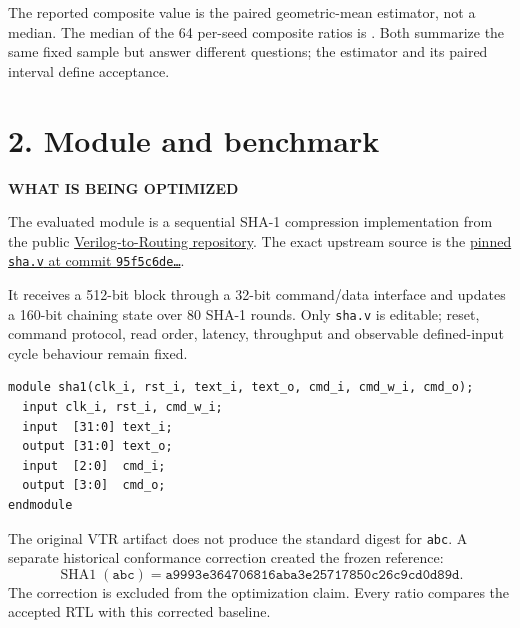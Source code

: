 \documentclass[10pt,a4paper]{article}
\newcommand{\smallcaps}[1]{\textcolor{Mid}{\fontsize{8.5}{10}\selectfont\bfseries\MakeUppercase{#1}}}
\newcommand{\newpageheading}[2]{\clearpage\section{#1}\smallcaps{#2}\vspace{6pt}}
\begin{document}
The reported composite value \AcceptedScore{} is the paired geometric-mean estimator, not a median. The median of the 64 per-seed composite ratios is \AcceptedCompositeMedian. Both summarize the same fixed sample but answer different questions; the estimator and its paired interval define acceptance.

\newpageheading{2. Module and benchmark}{What is being optimized}

The evaluated module is a sequential SHA-1 compression implementation from the public
\href{https://github.com/verilog-to-routing/vtr-verilog-to-routing}{Verilog-to-Routing repository}. The exact upstream source is the
\href{https://github.com/verilog-to-routing/vtr-verilog-to-routing/blob/95f5c6de9e158371ba7185bf97c07a84153735d6/vtr_flow/benchmarks/verilog/sha.v}{pinned \texttt{sha.v} at commit \texttt{95f5c6de…}}.

It receives a 512-bit block through a 32-bit command/data interface and updates a 160-bit chaining state over 80 SHA-1 rounds. Only \texttt{sha.v} is editable; reset, command protocol, read order, latency, throughput and observable defined-input cycle behaviour remain fixed.

\begin{lstlisting}[language=VerilogDiff]
module sha1(clk_i, rst_i, text_i, text_o, cmd_i, cmd_w_i, cmd_o);
  input clk_i, rst_i, cmd_w_i;
  input  [31:0] text_i;
  output [31:0] text_o;
  input  [2:0]  cmd_i;
  output [3:0]  cmd_o;
endmodule
\end{lstlisting}

\begin{center}
\end{center}

The original VTR artifact does not produce the standard digest for \texttt{abc}. A separate historical conformance correction created the frozen reference:
\[
\operatorname{SHA1}(\texttt{abc})=
\texttt{a9993e364706816aba3e25717850c26c9cd0d89d}.
\]
The correction is excluded from the optimization claim. Every ratio compares the accepted RTL with this corrected baseline.
\end{document}
